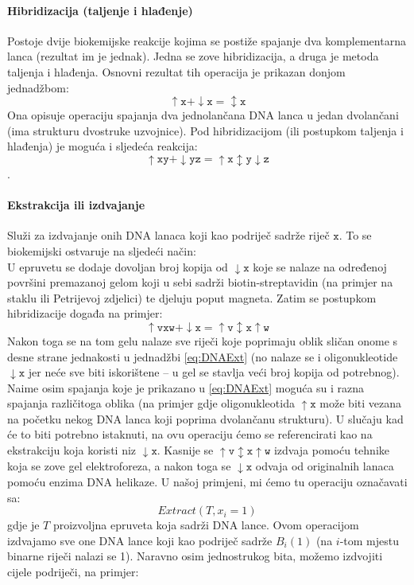 \documentclass[a4paper,oneside,12pt]{memoir} %
\begin{document}
\begin{spacing}{1.5}
\paragraph{Hibridizacija (taljenje i hlađenje)}
Postoje dvije biokemijske reakcije kojima se postiže spajanje dva komplementarna lanca (rezultat im je jednak). Jedna se zove hibridizacija, a druga je metoda taljenja i hlađenja. Osnovni rezultat tih operacija je prikazan donjom jednadžbom:
\[\mathtt{\uparrow x + \downarrow x=\updownarrow x}\]
Ona opisuje operaciju spajanja dva jednolančana DNA lanca u jedan dvolančani (ima strukturu dvostruke uzvojnice). Pod hibridizacijom (ili postupkom taljenja i hlađenja) je moguća i sljedeća reakcija:
\[\mathtt{\uparrow xy + \downarrow yz = \uparrow x \updownarrow y \downarrow z}\].
\paragraph{Ekstrakcija ili izdvajanje}
Služi za  izdvajanje onih DNA lanaca koji kao podriječ sadrže riječ $\mathtt{x}$. To se biokemijski ostvaruje na sljedeći način:\\
U epruvetu se dodaje dovoljan broj kopija od $\mathtt{\downarrow x}$ koje se nalaze na određenoj površini premazanoj gelom koji u sebi sadrži biotin-streptavidin (na primjer na staklu ili Petrijevoj zdjelici) te djeluju poput magneta. Zatim se postupkom hibridizacije događa na primjer:
\begin{equation}
\label{eq:DNAExt}
\mathtt{\uparrow vxw + \downarrow x = \uparrow v \updownarrow x \uparrow w}
\end{equation}
Nakon toga se na tom gelu nalaze sve riječi koje poprimaju oblik sličan onome s desne strane jednakosti u jednadžbi \ref{eq:DNAExt} (no nalaze se i oligonukleotide $\mathtt{\downarrow x}$ jer neće sve biti iskorištene -- u gel se stavlja veći broj kopija od potrebnog). Naime osim spajanja koje je prikazano u \ref{eq:DNAExt} moguća su i razna spajanja različitoga oblika (na primjer gdje oligonukleotida $\mathtt{\uparrow x}$ može biti vezana na početku nekog DNA lanca koji poprima dvolančanu strukturu). U slučaju kad će to biti potrebno istaknuti, na ovu operaciju ćemo se referencirati kao na ekstrakciju koja koristi niz $\mathtt{\downarrow x}$. Kasnije se $\mathtt{\uparrow v \updownarrow x \uparrow w}$ izdvaja pomoću tehnike koja se zove gel elektroforeza, a nakon toga se $\mathtt{\downarrow x}$ odvaja od originalnih lanaca pomoću enzima DNA helikaze. U našoj primjeni, mi ćemo tu operaciju označavati sa:
\[Extract(T, x_i=1)\]
gdje je $T$ proizvoljna epruveta koja sadrži DNA lance. Ovom operacijom izdvajamo sve one DNA lance koji kao podriječ sadrže $B_i(1)$ (na $i$-tom mjestu binarne riječi nalazi se 1). Naravno osim jednostrukog bita, možemo izdvojiti cijele podriječi, na primjer:

\end{spacing}
\end{document}

